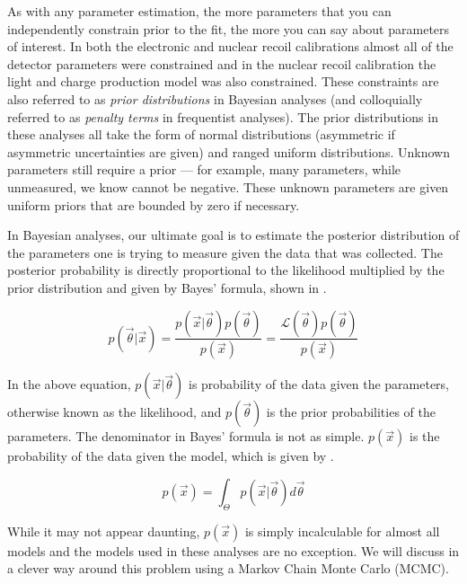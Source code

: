As with any parameter estimation, the more parameters that you can independently constrain prior to the fit, the more you can say about parameters of interest.  In both the electronic and nuclear recoil calibrations almost all of the detector parameters were constrained and in the nuclear recoil calibration the light and charge production model was also constrained.  These constraints are also referred to as \textit{prior distributions} in Bayesian analyses (and colloquially referred to as \textit{penalty terms} in frequentist analyses).  The prior distributions in these analyses all take the form of normal distributions (asymmetric if asymmetric uncertainties are given) and ranged uniform distributions.  Unknown parameters still require a prior --- for example, many parameters, while unmeasured, we know cannot be negative.  These unknown parameters are given uniform priors that are bounded by zero if necessary.


In Bayesian analyses, our ultimate goal is to estimate the posterior distribution of the parameters one is trying to measure given the data that was collected.  The posterior probability is directly proportional to the likelihood multiplied by the prior distribution and given by Bayes' formula, shown in  \cite{bayes1763essay}.

\begin{equation}
        \label{eqn:xe1t_bayes_formula}
        p(\vec{\theta}|\vec{x}) = \frac{p(\vec{x}|\vec{\theta}) p(\vec{\theta})}{p(\vec{x})} = \frac{\mathcal{L}(\vec{\theta}) p(\vec{\theta})}{p(\vec{x})}
\end{equation}


In the above equation, $p(\vec{x}|\vec{\theta})$ is probability of the data given the parameters, otherwise known as the likelihood, and $p(\vec{\theta})$ is the prior probabilities of the parameters.  The denominator in Bayes' formula is not as simple.  $p(\vec{x})$ is the probability of the data given the model, which is given by .


\begin{equation}
        \label{eqn:xe1t_px}
        p(\vec{x}) = \int_{\Theta} p(\vec{x}|\vec{\theta}) d\vec{\theta}
\end{equation}


While it may not appear daunting, $p(\vec{x})$ is simply incalculable for almost all models and the models used in these analyses are no exception.  We will discuss in  a clever way around this problem using a Markov Chain Monte Carlo (MCMC).

